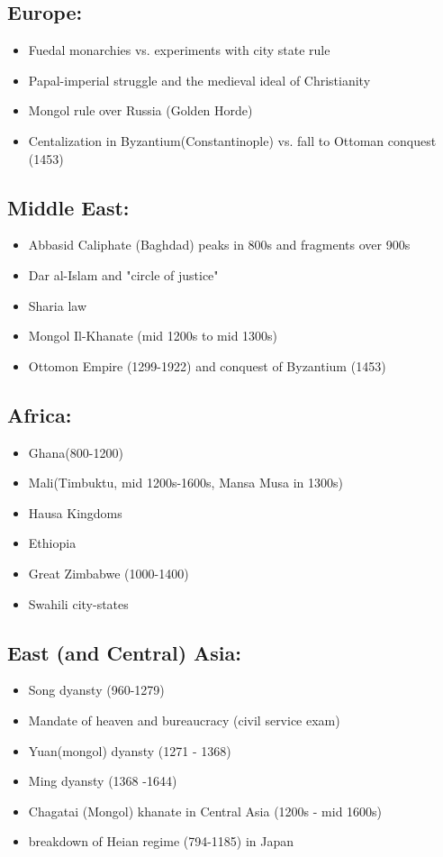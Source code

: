 \documentclass{report}
\begin{document}
\subsection{Europe:}
\begin{itemize}
  \item Fuedal monarchies vs. experiments with city state rule
  \item Papal-imperial struggle and the medieval ideal of Christianity
  \item Mongol rule over Russia (Golden Horde)
  \item Centalization in Byzantium(Constantinople) vs. fall to Ottoman conquest (1453)
\end{itemize}

\subsection{Middle East:}
\begin{itemize}
  \item Abbasid Caliphate (Baghdad) peaks in 800s and fragments over 900s 
  \item Dar al-Islam and  "circle of justice"
  \item Sharia law
  \item Mongol Il-Khanate (mid 1200s to mid 1300s)
  \item Ottomon Empire (1299-1922) and conquest of Byzantium (1453)
\end{itemize}

\subsection{Africa:}
\begin{itemize}
  \item Ghana(800-1200)
  \item Mali(Timbuktu, mid 1200s-1600s, Mansa Musa in 1300s)
  \item Hausa Kingdoms
  \item Ethiopia
  \item Great Zimbabwe (1000-1400)
  \item Swahili city-states
\end{itemize}

\subsection{East (and Central) Asia:}
\begin{itemize}
  \item Song dyansty (960-1279)
  \item Mandate of heaven and bureaucracy (civil service exam)
  \item Yuan(mongol) dyansty (1271 - 1368)
  \item Ming dyansty (1368 -1644)
  \item Chagatai (Mongol) khanate in Central Asia (1200s - mid 1600s)
  \item breakdown of Heian  regime (794-1185) in Japan
\end{itemize}
\end{document}
